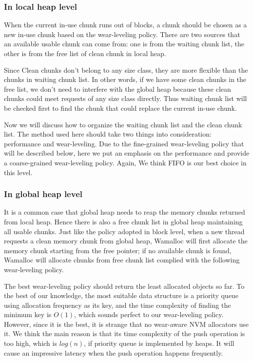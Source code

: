 \documentclass[10pt, conference, compsocconf]{IEEEtran}
\begin{document}
\subsubsection{In local heap level}

When the current in-use chunk runs out of blocks, 
a chunk should be chosen as a new in-use chunk based on the wear-leveling policy.
There are two sources that an available usable chunk can come from:
one is from the waiting chunk list, the other is from the free list of clean chunk in local heap.

Since Clean chunks don't belong to any size class, 
they are more flexible than the chunks in waiting chunk list.
In other words, if we have some clean chunks in the free list, 
we don't need to interfere with the global heap
because these clean chunks could meet requests of any size class directly.
Thus waiting chunk list will be checked first to find the chunk that could replace the current in-use chunk.

Now we will discuss how to organize the waiting chunk list and the clean chunk list.
The method used here should take two things into consideration:
performance and wear-leveling.
Due to the fine-grained wear-leveling policy that will be described below,
here we put an emphasis on the performance and provide a coarse-grained wear-leveling policy.
Again, We think FIFO is our best choice in this level.

\subsubsection{In global heap level}
It is a common case that global heap needs to reap the memory chunks returned from local heap.
Hence there is also a free chunk list in global heap maintaining all usable chunks. 
Just like the policy adopted in block level, 
when a new thread requests a clean memory chunk from global heap,
Wamalloc will first allocate the memory chunk starting from the free pointer; 
if no available chunk is found, Wamalloc will allocate chunks from free chunk list complied with the following wear-leveling policy.

The best wear-leveling policy should return the least allocated objects so far. 
To the best of our knowledge, the most suitable data structure is a priority queue using allocation frequency as its key,
and the time complexity of finding the minimum key is $O(1)$, which sounds perfect to our wear-leveling policy.
However, since it is the best, it is strange that no wear-aware NVM allocators use it.
We think the main reason is that its time complexity of the push operation is too high, 
which is $log(n)$, if priority queue is implemented by heaps. 
It will cause an impressive latency when the push operation happens frequently.
\end{document}
